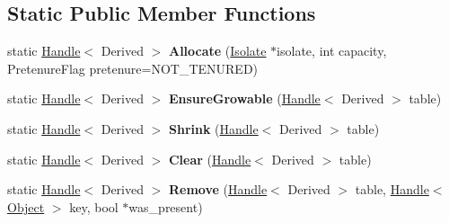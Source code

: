 \subsection*{Static Public Member Functions}
\begin{DoxyCompactItemize}
\item 
\hypertarget{classv8_1_1internal_1_1_ordered_hash_table_a52a1a44b8dbc3655952f6e41dcf2f68c}{}static \hyperlink{classv8_1_1internal_1_1_handle}{Handle}$<$ Derived $>$ {\bfseries Allocate} (\hyperlink{classv8_1_1internal_1_1_isolate}{Isolate} $\ast$isolate, int capacity, Pretenure\+Flag pretenure=N\+O\+T\+\_\+\+T\+E\+N\+U\+R\+E\+D)\label{classv8_1_1internal_1_1_ordered_hash_table_a52a1a44b8dbc3655952f6e41dcf2f68c}

\item 
\hypertarget{classv8_1_1internal_1_1_ordered_hash_table_ae177749413455eee0ddc92d44ad2d1a4}{}static \hyperlink{classv8_1_1internal_1_1_handle}{Handle}$<$ Derived $>$ {\bfseries Ensure\+Growable} (\hyperlink{classv8_1_1internal_1_1_handle}{Handle}$<$ Derived $>$ table)\label{classv8_1_1internal_1_1_ordered_hash_table_ae177749413455eee0ddc92d44ad2d1a4}

\item 
\hypertarget{classv8_1_1internal_1_1_ordered_hash_table_ac1b5d33ee2dd5b492c85e27e3a1ff25d}{}static \hyperlink{classv8_1_1internal_1_1_handle}{Handle}$<$ Derived $>$ {\bfseries Shrink} (\hyperlink{classv8_1_1internal_1_1_handle}{Handle}$<$ Derived $>$ table)\label{classv8_1_1internal_1_1_ordered_hash_table_ac1b5d33ee2dd5b492c85e27e3a1ff25d}

\item 
\hypertarget{classv8_1_1internal_1_1_ordered_hash_table_af6025a9e1e004a9b03b16aa34bda1866}{}static \hyperlink{classv8_1_1internal_1_1_handle}{Handle}$<$ Derived $>$ {\bfseries Clear} (\hyperlink{classv8_1_1internal_1_1_handle}{Handle}$<$ Derived $>$ table)\label{classv8_1_1internal_1_1_ordered_hash_table_af6025a9e1e004a9b03b16aa34bda1866}

\item 
\hypertarget{classv8_1_1internal_1_1_ordered_hash_table_a9fe8120601b81e25cc8393c84bc395c1}{}static \hyperlink{classv8_1_1internal_1_1_handle}{Handle}$<$ Derived $>$ {\bfseries Remove} (\hyperlink{classv8_1_1internal_1_1_handle}{Handle}$<$ Derived $>$ table, \hyperlink{classv8_1_1internal_1_1_handle}{Handle}$<$ \hyperlink{classv8_1_1internal_1_1_object}{Object} $>$ key, bool $\ast$was\+\_\+present)\label{classv8_1_1internal_1_1_ordered_hash_table_a9fe8120601b81e25cc8393c84bc395c1}

\end{DoxyCompactItemize}
